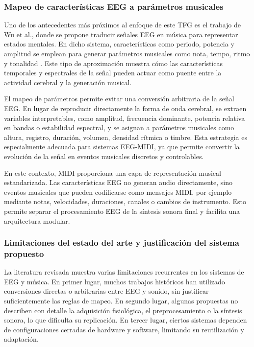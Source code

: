\documentclass[../main.tex]{subfiles}
\begin{document}
\subsubsection{Mapeo de características EEG a parámetros musicales}

Uno de los antecedentes más próximos al enfoque de este TFG es el trabajo de Wu et al., donde se propone traducir señales EEG en música para representar estados mentales. En dicho sistema, características como periodo, potencia y amplitud se emplean para generar parámetros musicales como nota, tempo, ritmo y tonalidad \cite{Wu2010}. Este tipo de aproximación muestra cómo las características temporales y espectrales de la señal pueden actuar como puente entre la actividad cerebral y la generación musical.

El mapeo de parámetros permite evitar una conversión arbitraria de la señal EEG. En lugar de reproducir directamente la forma de onda cerebral, se extraen variables interpretables, como amplitud, frecuencia dominante, potencia relativa en bandas o estabilidad espectral, y se asignan a parámetros musicales como altura, registro, duración, volumen, densidad rítmica o timbre. Esta estrategia es especialmente adecuada para sistemas EEG-MIDI, ya que permite convertir la evolución de la señal en eventos musicales discretos y controlables.

En este contexto, MIDI proporciona una capa de representación musical estandarizada. Las características EEG no generan audio directamente, sino eventos musicales que pueden codificarse como mensajes MIDI, por ejemplo mediante notas, velocidades, duraciones, canales o cambios de instrumento. Esto permite separar el procesamiento EEG de la síntesis sonora final y facilita una arquitectura modular.

\subsubsection{Limitaciones del estado del arte y justificación del sistema propuesto}

La literatura revisada muestra varias limitaciones recurrentes en los sistemas de EEG y música. En primer lugar, muchos trabajos históricos han utilizado conversiones directas o arbitrarias entre EEG y sonido, sin justificar suficientemente las reglas de mapeo. En segundo lugar, algunas propuestas no describen con detalle la adquisición fisiológica, el preprocesamiento o la síntesis sonora, lo que dificulta su replicación. En tercer lugar, ciertos sistemas dependen de configuraciones cerradas de hardware y software, limitando su reutilización y adaptación.
\end{document}
